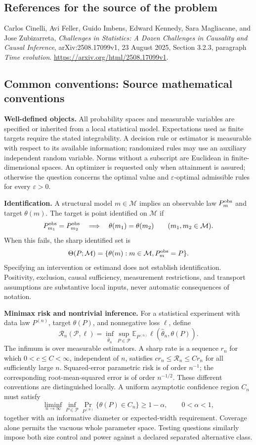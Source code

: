 \documentclass[11pt,a4paper]{article}
\newcommand{\E}{\mathbb E}
\begin{document}
\subsection*{References for the source of the problem}
Carlos Cinelli, Avi Feller, Guido Imbens, Edward Kennedy, Sara Magliacane, and Jose Zubizarreta, \emph{Challenges in Statistics: A Dozen Challenges in Causality and Causal Inference}, arXiv:2508.17099v1, 23 August 2025, Section 3.2.3, paragraph \emph{Time evolution}. \url{https://arxiv.org/html/2508.17099v1}.

\subsection*{Common conventions: Source mathematical conventions}

\textbf{Well-defined objects.}
All probability spaces and measurable variables are specified or inherited
from a local statistical model. Expectations used as finite targets require
the stated integrability. A decision rule or estimator is measurable with
respect to its available information; randomized rules may use an auxiliary
independent random variable. Norms without a subscript are Euclidean in
finite-dimensional spaces. An optimizer is requested only when attainment
is assured; otherwise the question concerns the optimal value and
$\varepsilon$-optimal admissible rules for every $\varepsilon>0$.

\textbf{Identification.}
A structural model $m\in\mathcal M$ implies an observable law
$P_m^{\rm obs}$ and target $\theta(m)$. The target is point identified on
$\mathcal M$ if
\[
 P_{m_1}^{\rm obs}=P_{m_2}^{\rm obs}
 \quad\Longrightarrow\quad\theta(m_1)=\theta(m_2)
 \qquad(m_1,m_2\in\mathcal M).
\]
When this fails, the sharp identified set is
\[
 \Theta(P;\mathcal M)=\{\theta(m):m\in\mathcal M,
                                  P_m^{\rm obs}=P\}.
\]
Specifying an intervention or estimand does not establish identification.
Positivity, exclusion, causal sufficiency, measurement restrictions, and
transport assumptions are substantive local inputs, never automatic
consequences of notation.

\textbf{Minimax risk and nontrivial inference.}
For a statistical experiment with data law $P^{(n)}$, target $\theta(P)$,
and nonnegative loss $\ell$, define
\[
 \mathcal R_n(\mathcal P,\ell)
   =\inf_{\widehat\theta_n}\sup_{P\in\mathcal P}
      \E_{P^{(n)}}\ell(\widehat\theta_n,\theta(P)).
\]
The infimum is over measurable estimators. A sharp rate is a sequence
$r_n$ for which $0<c\leq C<\infty$, independent of $n$, satisfies
$c r_n\leq\mathcal R_n\leq C r_n$ for all sufficiently large $n$.
Squared-error parametric risk is of order $n^{-1}$; the corresponding
root-mean-squared error is of order $n^{-1/2}$. These different conventions
are distinguished locally. A uniform asymptotic confidence region $C_n$
must satisfy
\[
 \liminf_{n\to\infty}\inf_{P\in\mathcal P}
     \Pr_{P^{(n)}}\{\theta(P)\in C_n\}\geq 1-\alpha,
 \qquad 0<\alpha<1,
\]
together with an informative diameter or expected-width requirement.
Coverage alone permits the vacuous whole parameter space. Testing questions
similarly impose both size control and power against a declared separated
alternative class.
\end{document}
